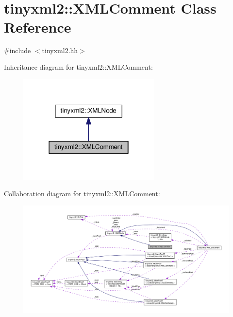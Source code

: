 \hypertarget{classtinyxml2_1_1XMLComment}{}\section{tinyxml2\+:\+:X\+M\+L\+Comment Class Reference}
\label{classtinyxml2_1_1XMLComment}


{\ttfamily \#include $<$tinyxml2.\+hh$>$}



Inheritance diagram for tinyxml2\+:\+:X\+M\+L\+Comment\+:
\nopagebreak
\begin{figure}[H]
\begin{center}
\leavevmode
\includegraphics[width=202pt]{classtinyxml2_1_1XMLComment__inherit__graph}
\end{center}
\end{figure}


Collaboration diagram for tinyxml2\+:\+:X\+M\+L\+Comment\+:
\nopagebreak
\begin{figure}[H]
\begin{center}
\leavevmode
\includegraphics[width=350pt]{classtinyxml2_1_1XMLComment__coll__graph}
\end{center}
\end{figure}
